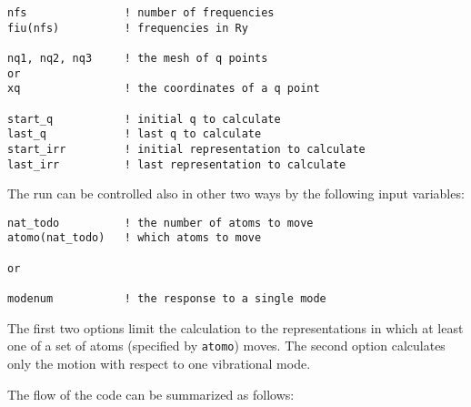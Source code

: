 \documentclass[12pt,a4paper]{article}
\begin{document}
\begin{verbatim}
nfs               ! number of frequencies
fiu(nfs)          ! frequencies in Ry

nq1, nq2, nq3     ! the mesh of q points
or
xq                ! the coordinates of a q point

start_q           ! initial q to calculate
last_q            ! last q to calculate
start_irr         ! initial representation to calculate
last_irr          ! last representation to calculate
\end{verbatim}

The run can be controlled also in other two ways by the following input
variables:

\begin{verbatim}
nat_todo          ! the number of atoms to move
atomo(nat_todo)   ! which atoms to move

or

modenum           ! the response to a single mode
\end{verbatim}
The first two options limit the calculation to the representations in which
at least one of a set of atoms (specified by \texttt{atomo}) moves.
The second option calculates only the motion with respect to one 
vibrational mode.

The flow of the code can be summarized as follows:
\end{document}
